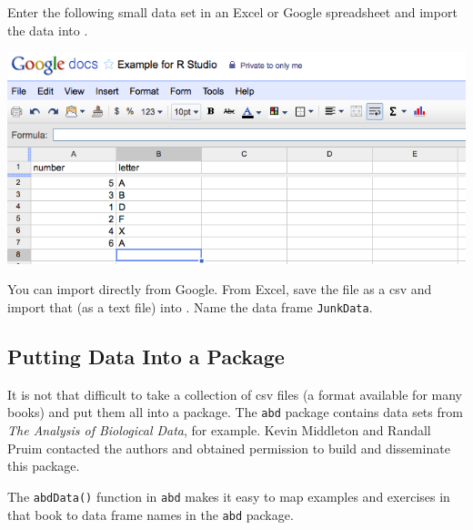 \begin{problem}
Enter the following small data set in an Excel or Google spreadsheet and import the 
data into \Rstudio.

\begin{center}
\includegraphics[width=.5\textwidth]{images/GoogleSpreadsheet}
\end{center}

You can import directly from Google.  From Excel, save the file as a csv and
import that (as a text file) into \Rstudio.  Name the data frame \texttt{JunkData}.
\end{problem}

\subsection{Putting Data Into a Package}

It is not that difficult to take a collection of csv files (a format available for many books)
and put them all into a package.
The \verb!abd! package contains data sets from \textit{The Analysis of Biological Data}, for example.  
Kevin Middleton and Randall Pruim contacted the authors and obtained permission to 
build and disseminate this package.

The \verb!abdData()! function in \verb!abd! makes it easy to map examples and exercises in that book to 
data frame names in the \verb!abd! package.

\begin{knitrout}
\end{knitrout}


